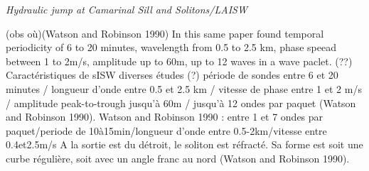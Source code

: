 \textit{Hydraulic jump at Camarinal Sill and Solitons/LAISW}



















(obs où)(Watson and Robinson 1990) In this same paper found temporal periodicity of 6 to 20 minutes, wavelength from 0.5 to 2.5 km, phase speead between 1 to 2m/s, amplitude up to 60m, up to 12 waves in a wave paclet. (??)
Caractéristiques de sISW diverses études (?) période de sondes entre 6 et 20 minutes / longueur d'onde entre 0.5 et 2.5 km / vitesse de phase entre 1 et 2 m/s / amplitude peak-to-trough jusqu'à 60m / jusqu'à 12 ondes par paquet (Watson and Robinson 1990). Watson and Robinson 1990 : entre 1 et 7 ondes par paquet/periode de 10à15min/longueur d'onde entre 0.5-2km/vitesse entre 0.4et2.5m/s
A la sortie est du détroit, le soliton est réfracté. Sa forme est soit une curbe régulière, soit avec un angle franc au nord (Watson and Robinson 1990).





